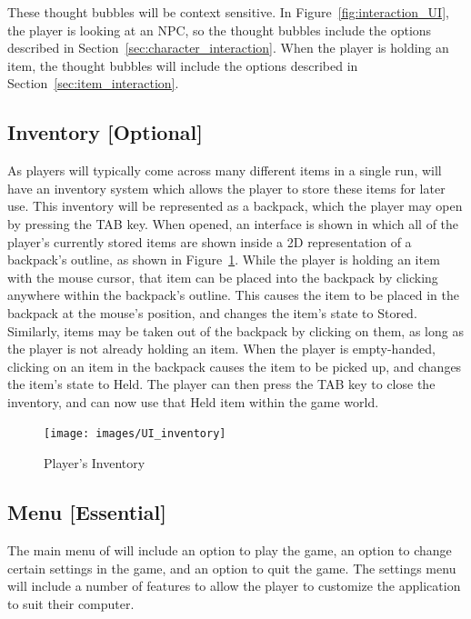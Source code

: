 \documentclass{GlobalDocument}
\begin{document}
These thought bubbles will be context sensitive. In Figure~\ref{fig:interaction_UI}, the player is looking at an NPC, so the thought bubbles include the options described in Section~\ref{sec:character_interaction}. When the player is holding an item, the thought bubbles will include the options described in Section~\ref{sec:item_interaction}.


\subsection{Inventory [Optional]}
\label{sec:inventory}
As players will typically come across many different items in a single run, \ourgame{} will have an inventory system which allows the player to store these items for later use. This inventory will be represented as a backpack, which the player may open by pressing the TAB key. When opened, an interface is shown in which all of the player's currently stored items are shown inside a 2D representation of a backpack's outline, as shown in Figure~\ref{fig:inventory}. While the player is holding an item with the mouse cursor, that item can be placed into the backpack by clicking anywhere within the backpack's outline. This causes the item to be placed in the backpack at the mouse's position, and changes the item's state to Stored. Similarly, items may be taken out of the backpack by clicking on them, as long as the player is not already holding an item. When the player is empty-handed, clicking on an item in the backpack causes the item to be picked up, and changes the item's state to Held. The player can then press the TAB key to close the inventory, and can now use that Held item within the game world.

\begin{figure}[htb]
\centering
\texttt{[image: images/UI\_inventory]}
\caption{Player's Inventory}
\label{fig:inventory}
\end{figure}

\subsection{Menu [Essential]}

The main menu of \ourgame{} will include an option to play the game, an option to change certain settings in the game, and an option to quit the game. The settings menu will include a number of features to allow the player to customize the application to suit their computer.
\end{document}

